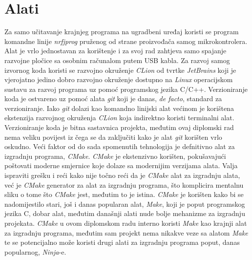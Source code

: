 \section{Alati}
Za samo učitavanje krajnjeg programa na ugradbeni uređaj koristi se program komandne linije \textit{nrfjprog} pruženog od strane proizvođača samog mikrokontrolera. Alat je vrlo jednostavan za korištenje i za svoj rad zahtjeva samo spajanje razvojne pločice sa osobnim računalom putem USB kabla. Za razvoj samog izvornog koda koristi se razvojno okruženje \textit{CLion} od tvrtke \textit{JetBrains} koji je vjerojatno jedino dobro razvojno okruženje dostupno na \textit{Linux} operacijskom sustavu za razvoj programa uz pomoć programskog jezika C/C++. Verzioniranje koda je ostvareno uz pomoć alata \textit{git} koji je danas, \textit{de facto}, standard za verzioniranje. Iako \textit{git} dolazi kao komandno linijski alat većinom je korištena ekstenzija razvojnog okruženja \textit{CLion} koja indirektno koristi terminalni alat. Verzioniranje koda je bitna sastavnica projekta, međutim ovaj diplomski rad nema veliku povijest iz čega se da zaključiti kako je alat \textit{git} korišten vrlo oskudno. Veći faktor od do sada spomenutih tehnologija je defnitivno alat za izgradnju programa, \textit{CMake}. \textit{CMake} je ekstenzivno korišten, pokušavajući poštovati moderne smjernice koje dolaze sa modernijim verzijama alata. Valja ispraviti grešku i reći kako nije točno reći da je \textit{CMake} alat za izgradnju alata, već je \textit{CMake} generator za alat za izgradnju programa, što komplicira mentalnu sliku o tome što \textit{CMake} jest, međutim to je istina. \textit{CMake} je korišten kako bi se nadomijestilo stari, još i danas popularan alat, \textit{Make}, koji je poput programskog jezika C, dobar alat, međutim današnji alati nude bolje mehanizme za izgradnju projekata. \textit{CMake} u ovom diplomskom radu interno koristi \textit{Make} kao krajnji alat za izgradnju programa, međutim sam projekt nema nikakve veze sa alatom \textit{Make} te se potencijalno može koristi drugi alati za izgradnju programa poput, danas popularnog, \textit{Ninja}-e.\\
